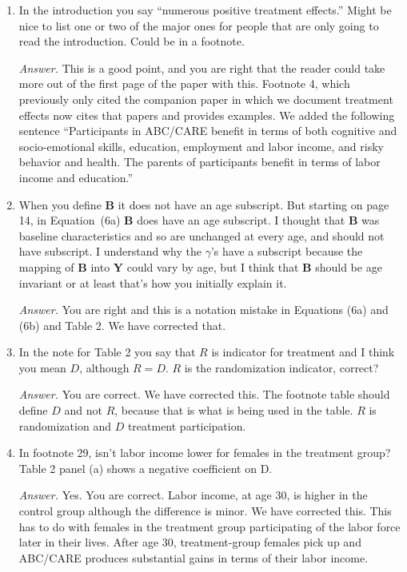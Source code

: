 \begin{enumerate}

\item In the introduction you say ``numerous positive treatment effects.'' Might be nice to list one or two of the major ones for people that are only going to read the introduction. Could be in a footnote. 

\noindent \textit{Answer.} This is a good point, and you are right that the reader could take more out of the first page of the paper with this. Footnote 4, which previously only cited the companion paper in which we document treatment effects now cites that papers and provides examples. We added the following sentence ``Participants in ABC/CARE benefit in terms of both cognitive and socio-emotional skills, education, employment and labor income, and risky behavior and health. The parents of participants benefit in terms of labor income and education.''

\item When you define $\bm{B}$ it does not have an age subscript. But starting on page 14, in Equation~(6a) $\bm{B}$ does have an age subscript. I thought that $\bm{B}$ was baseline characteristics and so are unchanged at every age, and should not have subscript. I understand why the $\gamma$'s have a subscript because the mapping of $\bm{B}$ into $\bm{Y}$ could vary by age, but I think that $\bm{B}$ should be age invariant or at least that's how you initially explain it. 

\noindent \textit{Answer.} You are right and this is a notation mistake in Equations (6a) and (6b) and Table 2. We have corrected that.

\item In the note for Table 2 you say that $R$ is indicator for treatment and I think you mean $D$, although $R=D$.  $R$ is the randomization indicator, correct?

\noindent \textit{Answer.} You are correct. We have corrected this. The footnote table should define $D$ and not $R$, because that is what is being used in the table. $R$ is randomization and $D$ treatment participation.

\item In footnote 29, isn't labor income lower for females in the treatment group? Table 2 panel (a) shows a negative coefficient on D.

\noindent \textit{Answer.} Yes. You are correct. Labor income, at age 30, is higher in the control group although the difference is minor. We have corrected this. This has to do with females in the treatment group participating of the labor force later in their lives. After age 30, treatment-group females pick up and ABC/CARE produces substantial gains in terms of their labor income.


\end{enumerate}
